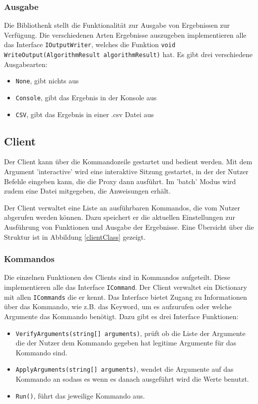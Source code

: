 \subsubsection{Ausgabe}

Die Bibliothenk stellt die Funktionalität zur Ausgabe von Ergebnissen zur Verfügung. Die verschiedenen Arten Ergebnisse auszugeben implementieren alle
das Interface \verb|IOutputWriter|, welches die Funktion \verb|void WriteOutput(AlgorithmResult algorithmResult)| hat. Es gibt drei verschiedene Ausgabearten:

\begin{itemize}
  \item \verb|None|, gibt nichts aus
  \item \verb|Console|, gibt das Ergebnis in der Konsole aus
  \item \verb|CSV|, gibt das Ergebnis in einer .csv Datei aus
\end{itemize}


\subsection{Client}

Der Client kann über die Kommandozeile gestartet und bedient werden. Mit dem Argument 'interactive' wird eine interaktive Sitzung gestartet,
in der der Nutzer Befehle eingeben kann, die die Proxy dann ausführt. Im 'batch' Modus wird zudem eine Datei mitgegeben, die Anweisungen erhält.

Der Client verwaltet eine Liste an ausführbaren Kommandos, die vom Nutzer abgerufen werden können. Dazu speichert er die aktuellen Einstellungen zur Ausführung von Funktionen und Ausgabe der Ergebnisse. Eine Übersicht über die Struktur ist in Abbildung \ref{clientClass} gezeigt.



\subsubsection{Kommandos}

Die einzelnen Funktionen des Clients sind in Kommandos aufgeteilt.
Diese implementieren alle das Interface \verb|ICommand|. Der Client verwaltet ein Dictionary mit allen \verb|ICommands| die er kennt.
Das Interface bietet Zugang zu Informationen über das Kommando, wie z.B. das Keyword, um es aufzurufen oder welche Argumente das Kommando benötigt.
Dazu gibt es drei Interface Funktionen:

\begin{itemize}
  \item \verb|VerifyArguments(string[] arguments)|, prüft ob die Liste der Argumente die der Nutzer dem Kommando gegeben hat legitime Argumente für das Kommando sind.
  \item \verb|ApplyArguments(string[] arguments)|, wendet die Argumente auf das Kommando an sodass es wenn es danach ausgeführt wird die Werte benutzt.
  \item \verb|Run()|, führt das jeweilige Kommando aus.
\end{itemize}


